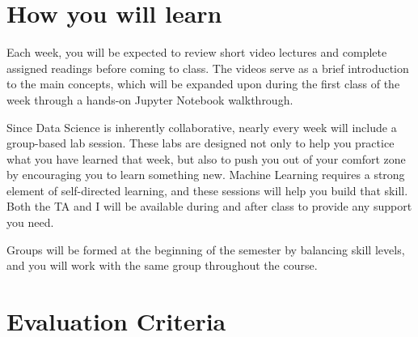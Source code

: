 \documentclass[12pt]{article}
\begin{document}
\section*{How you will learn}

Each week, you will be expected to review short video lectures and complete assigned readings before coming to class. The videos serve as a brief introduction to the main concepts, which will be expanded upon during the first class of the week through a hands-on Jupyter Notebook walkthrough.

Since Data Science is inherently collaborative, nearly every week will include a group-based lab session. These labs are designed not only to help you practice what you have learned that week, but also to push you out of your comfort zone by encouraging you to learn something new. Machine Learning requires a strong element of self-directed learning, and these sessions will help you build that skill. Both the TA and I will be available during and after class to provide any support you need.

Groups will be formed at the beginning of the semester by balancing skill levels, and you will work with the same group throughout the course.

\section*{Evaluation Criteria}
\end{document}

